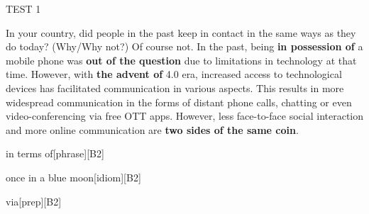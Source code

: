\begin{glossarymc}[Cambridge 7]
\begin{test}{TEST 1}
    \begin{qa}{In your country, did people in the past keep in contact in the same ways as they do today? (Why/Why not?)}
    Of course not. In the past, being \textbf{in possession of} a mobile phone was \textbf{out of the question} due to limitations in technology at that time. However, with \textbf{the advent of} 4.0 era, increased access to technological devices has facilitated communication in various aspects. This results in more widespread communication in the forms of distant phone calls, chatting or even video-conferencing via free OTT apps. However, less face-to-face social interaction and more online communication are \textbf{two sides of the same coin}.
    \end{qa}
            \begin{VocabExplain}[Part 1]
                \begin{ExplainCard}{in terms of}[phrase][B2]
            \end{ExplainCard}

            \begin{ExplainCard}{once in a blue moon}[idiom][B2]
            \end{ExplainCard}

            \begin{ExplainCard}{via}[prep][B2]
            \end{ExplainCard}


\end{VocabExplain}
\end{test}
\end{glossarymc}
